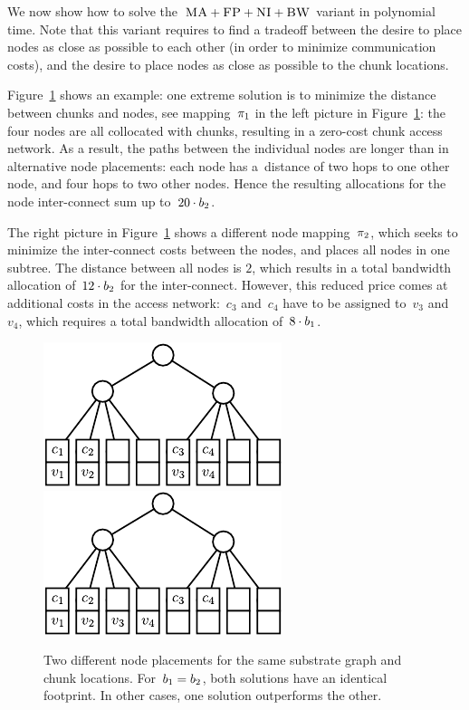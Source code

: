 We now show how to solve the~$\textsc{MA}+\textsc{FP}+\textsc{NI}+\textsc{BW}$ variant
in polynomial time.
Note that this variant requires to find a
tradeoff between the desire to place nodes as close as possible to each other
(in order to minimize communication costs), and the desire to place nodes
as close as possible to
the chunk locations.




 Figure~\ref{fig:dynamic_motivation} shows an example: one
extreme solution is to minimize the distance between chunks and nodes,
see mapping~$\pi_1$ in the left picture in
Figure~\ref{fig:dynamic_motivation}: the four nodes are all
collocated with chunks, resulting in a zero-cost chunk access network. As a
result, the paths between the individual nodes are longer than in alternative
node placements: each node has a~distance of two hops to one other node,
and four hops to two other nodes. Hence the resulting allocations for the
node inter-connect sum up to~$20 \cdot b_2$.


The right picture in Figure~\ref{fig:dynamic_motivation} shows a different node
mapping~$\pi_2$, which seeks to minimize the inter-connect costs
between the nodes, and places all nodes in one subtree. The distance between all
nodes is $2$, which results in a total bandwidth allocation of~$12\cdot b_2$
for the inter-connect. However, this reduced price comes at additional costs in
the access network:~$c_3$ and~$c_4$ have to be assigned to~$v_3$ and~$v_4$,
which requires a total bandwidth allocation of~$8 \cdot b_1$.


\begin{figure}
  \centering
\includegraphics[width = 0.39\columnwidth]{figs/static-mapping/dynamic_bad}
\hspace{1cm}
\centering
\includegraphics[width = 0.39\columnwidth]{figs/static-mapping/dynamic_good}
\caption{Two different node placements for the same substrate graph and chunk
locations. For~$b_1 = b_2$, both solutions have an identical
footprint. In other cases, one solution outperforms the other.}
\label{fig:dynamic_motivation}
\vspace{-1em}
\end{figure}



